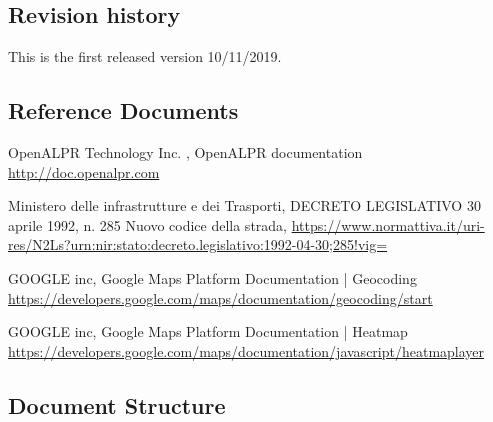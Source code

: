 \subsection{Revision history}
This is the first released version 10/11/2019.

\subsection{Reference Documents}
\begin{thebibliography}{00}
OpenALPR Technology Inc. ,
OpenALPR documentation \url{http://doc.openalpr.com}

 Ministero delle infrastrutture e dei Trasporti,
DECRETO LEGISLATIVO 30 aprile 1992, n. 285 Nuovo codice della strada,
 \url{https://www.normattiva.it/uri-res/N2Ls?urn:nir:stato:decreto.legislativo:1992-04-30;285!vig=}

 GOOGLE inc,
 Google Maps Platform Documentation | Geocoding
 \url{https://developers.google.com/maps/documentation/geocoding/start}

 GOOGLE inc,
 Google Maps Platform Documentation | Heatmap
 \url{https://developers.google.com/maps/documentation/javascript/heatmaplayer}

\end{thebibliography}

\subsection{Document Structure}
